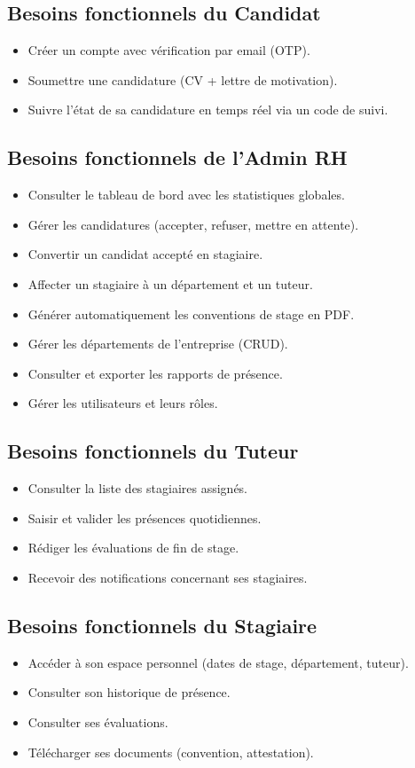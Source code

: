 \subsection{Besoins fonctionnels du Candidat}
\begin{itemize}
    \item Créer un compte avec vérification par email (OTP).
    \item Soumettre une candidature (CV + lettre de motivation).
    \item Suivre l'état de sa candidature en temps réel via un code de suivi.
\end{itemize}

\subsection{Besoins fonctionnels de l'Admin RH}
\begin{itemize}
    \item Consulter le tableau de bord avec les statistiques globales.
    \item Gérer les candidatures (accepter, refuser, mettre en attente).
    \item Convertir un candidat accepté en stagiaire.
    \item Affecter un stagiaire à un département et un tuteur.
    \item Générer automatiquement les conventions de stage en PDF.
    \item Gérer les départements de l'entreprise (CRUD).
    \item Consulter et exporter les rapports de présence.
    \item Gérer les utilisateurs et leurs rôles.
\end{itemize}

\subsection{Besoins fonctionnels du Tuteur}
\begin{itemize}
    \item Consulter la liste des stagiaires assignés.
    \item Saisir et valider les présences quotidiennes.
    \item Rédiger les évaluations de fin de stage.
    \item Recevoir des notifications concernant ses stagiaires.
\end{itemize}

\subsection{Besoins fonctionnels du Stagiaire}
\begin{itemize}
    \item Accéder à son espace personnel (dates de stage, département, tuteur).
    \item Consulter son historique de présence.
    \item Consulter ses évaluations.
    \item Télécharger ses documents (convention, attestation).
\end{itemize}

